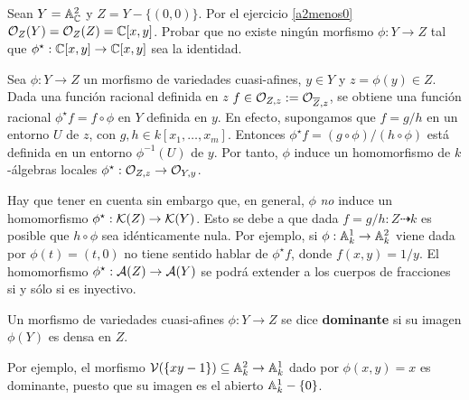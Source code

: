 \documentclass[ACGA.tex]{subfiles}
\begin{document}
\begin{ejer}
 Sean $Y=\mathbb{A}^2_{\mathbb{C}}$ y $Z=Y-\{(0,0)\}$. Por el ejercicio \ref{a2menos0} ${\mathcal O}_{Z}(Y)={\mathcal O}_{Z}(Z)=\mathbb{C}[x,y]$. Probar que no existe ningún morfismo $\phi:Y\to Z$ tal que $\phi^\star:\mathbb{C}[x,y]\to\mathbb{C}[x,y]$ sea la identidad.
\end{ejer}



Sea $\phi:Y\to Z$ un morfismo de variedades cuasi-afines, $y\in Y$ y $z=\phi(y)\in Z$. Dada una función racional definida en $z$  $f\in{\mathcal O}_{Z,z}:={\mathcal O}_{\overline Z,z}$, se obtiene una función racional $\phi^\star f=f\circ\phi$ en $Y$ definida en $y$. En efecto, supongamos que $f=g/h$ en un entorno $U$ de $z$, con $g,h\in k[x_1,\ldots,x_m]$. Entonces $\phi^\star f=(g\circ \phi)/(h\circ\phi)$ está definida en un entorno $\phi^{-1}(U)$ de $y$. Por tanto, $\phi$ induce un homomorfismo de $k$-álgebras locales $\phi^\star:{\mathcal O}_{Z,z}\to{\mathcal O}_{Y,y}$.

Hay que tener en cuenta sin embargo que, en general, $\phi$ \emph{no} induce un homomorfismo $\phi^\star:{\mathcal K}(Z)\to{\mathcal K}(Y)$. Esto se debe a que dada $f=g/h:Z\dashrightarrow k$ es posible que $h\circ\phi$ sea idénticamente nula. Por ejemplo, si $\phi:\mathbb{A}^1_k\to\mathbb{A}^2_k$ viene dada por $\phi(t)=(t,0)$ no tiene sentido hablar de $\phi^\star f$, donde $f(x,y)=1/y$. El homomorfismo $\phi^\star:\mathcal{A}(Z)\to\mathcal{A}(Y)$ se podrá extender a los cuerpos de fracciones si y sólo si es inyectivo.

\begin{defi}
 Un morfismo de variedades cuasi-afines $\phi:Y\to Z$ se dice {\bf dominante} si su imagen $\phi(Y)$ es densa en $Z$. 
\end{defi}

Por ejemplo, el morfismo $\mathcal{V}(\{xy-1\})\subseteq\mathbb{A}^2_k\to\mathbb{A}^1_k$ dado por $\phi(x,y)=x$ es dominante, puesto que su imagen es el abierto $\mathbb{A}^1_k-\{0\}$.
\end{document}
